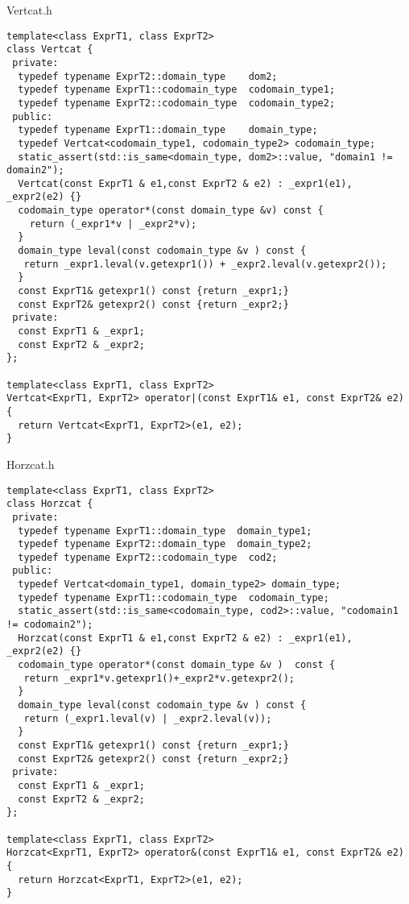 \documentclass[9pt]{beamer}
\begin{document}
\begin{frame}[fragile]{Vertcat.h}
\begin{lstlisting}
template<class ExprT1, class ExprT2>
class Vertcat {
 private:
  typedef typename ExprT2::domain_type    dom2;
  typedef typename ExprT1::codomain_type  codomain_type1;
  typedef typename ExprT2::codomain_type  codomain_type2;
 public:
  typedef typename ExprT1::domain_type    domain_type;
  typedef Vertcat<codomain_type1, codomain_type2> codomain_type;
  static_assert(std::is_same<domain_type, dom2>::value, "domain1 != domain2");
  Vertcat(const ExprT1 & e1,const ExprT2 & e2) : _expr1(e1), _expr2(e2) {}
  codomain_type operator*(const domain_type &v) const {
    return (_expr1*v | _expr2*v);
  }
  domain_type leval(const codomain_type &v ) const {
   return _expr1.leval(v.getexpr1()) + _expr2.leval(v.getexpr2());
  }
  const ExprT1& getexpr1() const {return _expr1;}
  const ExprT2& getexpr2() const {return _expr2;}
 private:
  const ExprT1 & _expr1;
  const ExprT2 & _expr2;
};

template<class ExprT1, class ExprT2>
Vertcat<ExprT1, ExprT2> operator|(const ExprT1& e1, const ExprT2& e2) {
  return Vertcat<ExprT1, ExprT2>(e1, e2);
}
\end{lstlisting}
\end{frame}

\begin{frame}[fragile]{Horzcat.h}
\begin{lstlisting}
template<class ExprT1, class ExprT2>
class Horzcat {
 private:
  typedef typename ExprT1::domain_type  domain_type1;
  typedef typename ExprT2::domain_type  domain_type2;
  typedef typename ExprT2::codomain_type  cod2;
 public:
  typedef Vertcat<domain_type1, domain_type2> domain_type;
  typedef typename ExprT1::codomain_type  codomain_type;
  static_assert(std::is_same<codomain_type, cod2>::value, "codomain1 != codomain2");
  Horzcat(const ExprT1 & e1,const ExprT2 & e2) : _expr1(e1), _expr2(e2) {}
  codomain_type operator*(const domain_type &v )  const {
   return _expr1*v.getexpr1()+_expr2*v.getexpr2();
  }
  domain_type leval(const codomain_type &v ) const {
   return (_expr1.leval(v) | _expr2.leval(v));
  }
  const ExprT1& getexpr1() const {return _expr1;}
  const ExprT2& getexpr2() const {return _expr2;}
 private:
  const ExprT1 & _expr1;
  const ExprT2 & _expr2;
};

template<class ExprT1, class ExprT2>
Horzcat<ExprT1, ExprT2> operator&(const ExprT1& e1, const ExprT2& e2) {
  return Horzcat<ExprT1, ExprT2>(e1, e2);
}
\end{lstlisting}
\end{frame}
\end{document}
